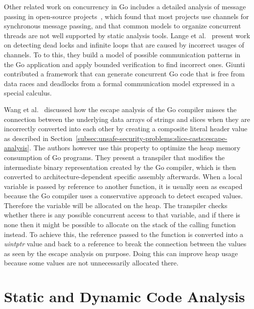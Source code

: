 Other related work on concurrency in Go includes a detailed analysis of message passing in open-source
projects~\cite{dilley2019}, which found that most projects use channels for synchronous message passing, and that common
models to organize concurrent threads are not well supported by static analysis tools.
Lange et al.~\cite{lange2017} present work on detecting dead locks and infinite loops that are caused by incorrect
usages of channels.
To to this, they build a model of possible communication patterns in the Go application and apply bounded verification
to find incorrect ones.
Giunti~\cite{giunti2020} contributed a framework that can generate concurrent Go code that is free from data races and
deadlocks from a formal communication model expressed in a special calculus.

Wang et al.~\cite{wang2020} discussed how the escape analysis of the Go compiler misses the connection between the
underlying data arrays of strings and slices when they are incorrectly converted into each other by creating a composite
literal header value as described in Section~\ref{subsec:unsafe-security-problems:slice-casts:escape-analysis}.
The authors however use this property to optimize the heap memory consumption of Go programs.
They present a transpiler that modifies the intermediate binary representation created by the Go compiler, which is then
converted to architecture-dependent specific assembly afterwards.
When a local variable is passed by reference to another function, it is usually seen as escaped because the Go compiler
uses a conservative approach to detect escaped values.
Therefore the variable will be allocated on the heap.
The transpiler checks whether there is any possible concurrent access to that variable, and if there is none then it
might be possible to allocate on the stack of the calling function instead.
To achieve this, the reference passed to the function is converted into a \textit{uintptr} value and back to a reference
to break the connection between the values as seen by the escape analysis on purpose.
Doing this can improve heap usage because some values are not unnecessarily allocated there.



\section{Static and Dynamic Code Analysis}\label{sec:related-work:static-code-analysis}

